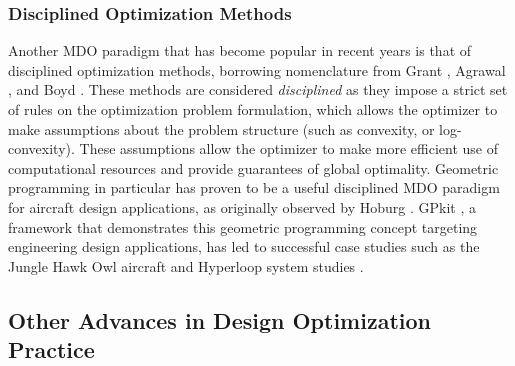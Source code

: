 \subsubsection{Disciplined Optimization Methods}

Another MDO paradigm that has become popular in recent years is that of disciplined optimization methods, borrowing nomenclature from Grant \cite{grant_disciplined_2006}, Agrawal \cite{agrawal_disciplined_2019}, and Boyd \cite{boyd_tutorial_2007, boyd_convex_2004}. These methods are considered \textit{disciplined} as they impose a strict set of rules on the optimization problem formulation, which allows the optimizer to make assumptions about the problem structure (such as convexity, or log-convexity). These assumptions allow the optimizer to make more efficient use of computational resources and provide guarantees of global optimality. Geometric programming in particular has proven to be a useful disciplined MDO paradigm for aircraft design applications, as originally observed by Hoburg \cite{hoburg_geometric_2014}. GPkit \cite{gpkit, hoburg_geometric_2014, kirschen}, a framework that demonstrates this geometric programming concept targeting engineering design applications, has led to successful case studies such as the Jungle Hawk Owl aircraft \cite{jho} and Hyperloop system studies \cite{gpkit}.

\subsection{Other Advances in Design Optimization Practice}




